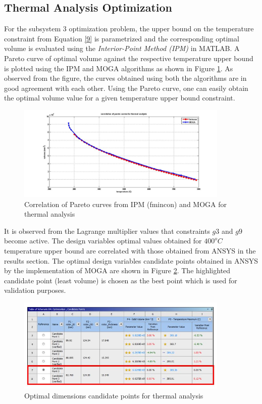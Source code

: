 \documentclass[12pt]{article}
\begin{document}
\subsection{Thermal Analysis Optimization}
For the subsystem 3 optimization problem, the upper bound on the temperature constraint from Equation \ref{9} is parametrized and the corresponding optimal volume is evaluated using the \emph{Interior-Point Method (IPM)} in MATLAB. A Pareto curve of optimal volume against the respective temperature upper bound is plotted using the IPM and MOGA algorithms as shown in Figure \ref{fig4}. As observed from the figure, the curves obtained using both the algorithms are in good agreement with each other. Using the Pareto curve, one can easily obtain the optimal volume value for a given temperature upper bound constraint. 
\begin{figure}[H]
\begin{center}
\includegraphics[width=0.9\textwidth]{thermal_pareto.jpg}
\caption{Correlation of Pareto curves from IPM (fmincon) and MOGA for thermal analysis}
\label{fig4}
\end{center}
\end{figure}
It is observed from the Lagrange multiplier values that constraints $g3$ and $g9$ become active. The design variables optimal values obtained for $400^{o}C$ temperature upper bound are correlated with those obtained from ANSYS in the results section. The optimal design variables candidate points obtained in ANSYS by the implementation of MOGA are shown in Figure \ref{ct}. The highlighted candidate point (least volume) is chosen as the best point which is used for validation purposes.
\begin{figure}[H]
\begin{center}
\includegraphics[width=0.9\textwidth]{ct.jpg}
\caption{Optimal dimensions candidate points for thermal analysis}
\label{ct}
\end{center}
\end{figure}
\end{document}
